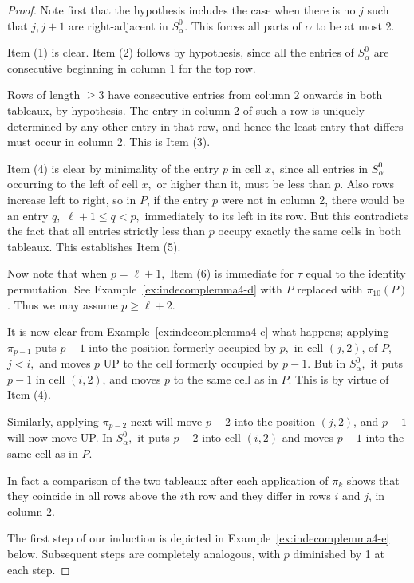 \documentclass[12pt,letterpaper]{amsart}
\theoremstyle{definition}
\begin{document}
\begin{proof} Note first that the hypothesis includes the case when there is no $j$ such that $j, j+1$ are right-adjacent in $S^0_\alpha.$ This forces all parts of $\alpha$ to be at most 2. 

Item (1) is clear.   Item (2) follows by hypothesis, since all the entries of  $S^0_\alpha$ are consecutive  beginning in column 1 for the top row.  

Rows of length $\ge 3$ have consecutive entries from  column 2 onwards in both tableaux, by hypothesis.  The entry in column 2 of such a row is uniquely determined by any other entry in that row, and hence the least entry that differs must occur in column 2.  This is Item (3).

Item (4) is clear by minimality of the entry $p$ in cell $x,$ since all entries in $S^0_\alpha$ occurring to the left of cell $x,$ or higher than it,  must be less than $p.$ Also rows increase left to right, so in $P$, if the entry $p$ were not in column 2, there would be an entry $q,$ $\ell+1\le q<p,$ immediately to its left in its row.  But this contradicts the fact that all entries strictly less than $p$ occupy exactly the same cells in both tableaux.  This establishes Item (5).

Now note that when $p=\ell+1,$ Item (6) is immediate for $\tau$ equal to the identity permutation.  See Example~\ref{ex:indecomplemma4-d} with $P$ replaced with $\pi_{10}(P)$.  Thus we may assume $p\ge \ell+2.$

It is now clear from Example~\ref{ex:indecomplemma4-c} what happens; applying $\pi_{p-1}$ puts $p-1$ into the position formerly occupied by $p,$ in cell $(j,2)$, of $P$, $j<i,$ and moves $p$ UP to the cell formerly occupied by $p-1.$ But in $S^0_\alpha,$ it puts $p-1$ in cell $(i,2)$, and moves $p$ to the same cell as in $P$. This is by virtue of Item (4).

Similarly, applying $\pi_{p-2}$ next will move $p-2$ into the position $(j,2)$, and $p-1$ will now move UP.  In 
$S^0_\alpha,$  it puts $p-2$ into cell $(i,2)$ and moves $p-1$ into the same cell as in $P.$ 

In fact a comparison of the two tableaux after each application of $\pi_k$ shows that they coincide in all rows above the $i$th row and they differ in rows $i$ and $j$, in column 2.

The first step of our induction is depicted in Example~\ref{ex:indecomplemma4-e} below.  Subsequent steps are completely analogous, with $p$ diminished by 1 at each step.


\end{proof}
\end{document}

